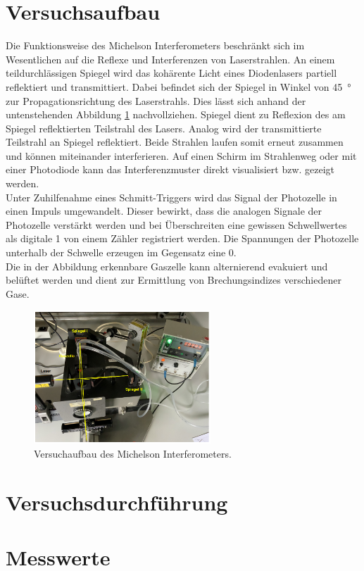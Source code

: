 


\section{Versuchsaufbau}

Die Funktionsweise des Michelson Interferometers beschränkt sich  im Wesentlichen auf die Reflexe und Interferenzen 
von Laserstrahlen. An einem teildurchlässigen Spiegel wird das kohärente Licht eines Diodenlasers partiell reflektiert 
und transmittiert. Dabei befindet sich der Spiegel in Winkel von \qty{45}{\degree} zur Propagationsrichtung des Laserstrahls.
Dies lässt sich anhand der untenstehenden Abbildung \ref{fig:Aufbau} nachvollziehen. Spiegel  dient zu Reflexion des 
am Spiegel reflektierten Teilstrahl des Lasers. Analog wird der transmittierte Teilstrahl an Spiegel  reflektiert.
Beide Strahlen laufen somit erneut zusammen und können miteinander interferieren. Auf einen Schirm im Strahlenweg oder mit einer
Photodiode kann das Interferenzmuster direkt visualisiert bzw. gezeigt werden.\\

\noindent Unter Zuhilfenahme eines Schmitt-Triggers wird das Signal der Photozelle in einen Impuls umgewandelt. Dieser bewirkt,
dass die analogen Signale der Photozelle verstärkt werden und bei Überschreiten eine gewissen Schwellwertes als digitale 1 von 
einem Zähler registriert werden. Die Spannungen der Photozelle unterhalb der Schwelle erzeugen im Gegensatz eine 0.\\

\noindent Die in der Abbildung erkennbare Gaszelle kann alternierend evakuiert und belüftet werden und dient zur Ermittlung 
von Brechungsindizes verschiedener Gase.

\begin{figure}[H]
    \centering
    \includegraphics[height=5cm]{Aufbau.png}
    \caption{Versuchaufbau des Michelson Interferometers\cite{Versuchsanleitung_v401}.}
    \label{fig:Aufbau}
\end{figure}

\section{Versuchsdurchführung}

\section{Messwerte}



